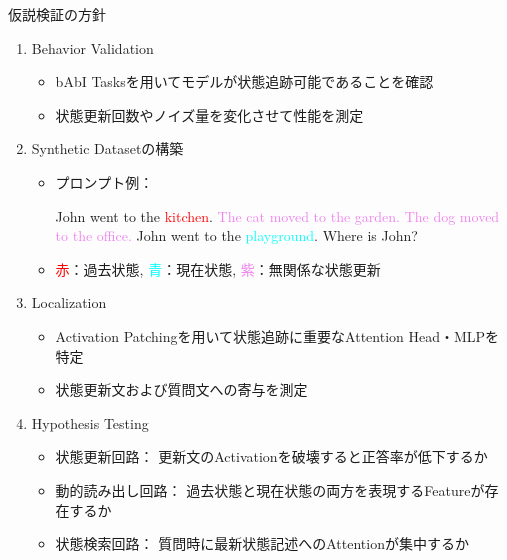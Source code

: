 \documentclass[aspectratio=43,xcolor=dvipsnames]{beamer}
\begin{document}
\begin{frame}{仮説検証の方針}
    \begin{enumerate}\scriptsize
        \item Behavior Validation
        \begin{itemize}\scriptsize
            \item bAbI Tasksを用いてモデルが状態追跡可能であることを確認
            \item 状態更新回数やノイズ量を変化させて性能を測定
        \end{itemize}
        \vspace{0.2em}
        \item Synthetic Datasetの構築
        \begin{itemize}\scriptsize
            \item プロンプト例：
            
            \tiny
            John went to the \textcolor{red}{kitchen}.
            \textcolor{violet}{The cat moved to the garden. The dog moved to the office.}
            John went to the \textcolor{cyan}{playground}.
            Where is John?
            \scriptsize
            \item \textcolor{red}{赤}：過去状態, \textcolor{cyan}{青}：現在状態, \textcolor{violet}{紫}：無関係な状態更新
        \end{itemize}
        \vspace{0.2em}
        \item Localization
        \begin{itemize}\scriptsize
            \item Activation Patchingを用いて状態追跡に重要なAttention Head・MLPを特定
            \item 状態更新文および質問文への寄与を測定
        \end{itemize}
        \vspace{0.2em}
        \item Hypothesis Testing
        \begin{itemize}\scriptsize
            \item 状態更新回路：
            更新文のActivationを破壊すると正答率が低下するか

            \item 動的読み出し回路：
            過去状態と現在状態の両方を表現するFeatureが存在するか

            \item 状態検索回路：
            質問時に最新状態記述へのAttentionが集中するか
        \end{itemize}
    \end{enumerate}
\end{frame}
\end{document}
